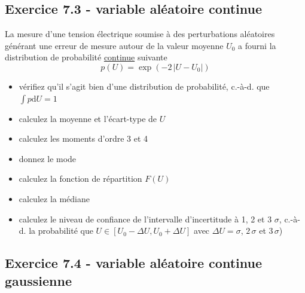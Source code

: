\subsection*{Exercice 7.3 - variable aléatoire continue}

La mesure d'une tension électrique soumise à des perturbations aléatoires générant une erreur de mesure autour de la valeur moyenne $U_0$ a fourni la distribution de probabilité \underline{continue} suivante
$$
    p(U)=\exp{(-2\,|U-U_0|)}
$$
\begin{itemize}
    \item vérifiez qu'il s'agit bien d'une distribution de probabilité, c.-à-d. que $\int p\text{d}U=1$
    \item calculez la moyenne et l'écart-type de $U$
    \item calculez les moments d'ordre 3 et 4
    \item donnez le mode
    \item calculez la fonction de répartition $F(U)$
    \item calculez la médiane
    \item calculez le niveau de confiance de l'intervalle d'incertitude à 1, 2 et 3 $\sigma$, c.-à-d. la probabilité que $U\in[U_0-\Delta U,U_0+\Delta U]$ avec $\Delta U=\sigma$, $2\,\sigma$ et $3\,\sigma$)
\end{itemize}

\subsection*{Exercice 7.4 - variable aléatoire continue gaussienne}

